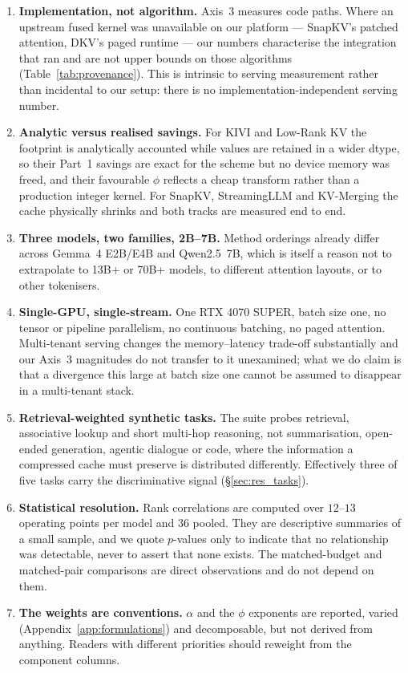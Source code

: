 \documentclass[sigplan,10pt,anonymous,review,nonacm]{acmart}
\begin{document}
\begin{enumerate}[leftmargin=*,itemsep=2.0pt,topsep=3pt]
\item \textbf{Implementation, not algorithm.} Axis~3 measures code paths.
  Where an upstream fused kernel was unavailable on our platform --- SnapKV's
  patched attention, DKV's paged runtime --- our numbers characterise the
  integration that ran and are not upper bounds on those algorithms
  (Table~\ref{tab:provenance}). This is intrinsic to serving measurement
  rather than incidental to our setup: there is no implementation-independent
  serving number.
\item \textbf{Analytic versus realised savings.} For KIVI and Low-Rank KV the
  footprint is analytically accounted while values are retained in a wider
  dtype, so their Part~1 savings are exact for the scheme but no device memory
  was freed, and their favourable $\phi$ reflects a cheap transform rather
  than a production integer kernel. For SnapKV, StreamingLLM and KV-Merging
  the cache physically shrinks and both tracks are measured end to end.
\item \textbf{Three models, two families, 2B--7B.} Method orderings already
  differ across Gemma~4 E2B/E4B and Qwen2.5~7B, which is itself a reason not
  to extrapolate to 13B+ or 70B+ models, to different attention layouts, or to
  other tokenisers.
\item \textbf{Single-GPU, single-stream.} One RTX 4070 SUPER, batch size one,
  no tensor or pipeline parallelism, no continuous batching, no paged
  attention. Multi-tenant serving changes the memory--latency trade-off
  substantially and our Axis~3 magnitudes do not transfer to it unexamined;
  what we do claim is that a divergence this large at batch size one cannot be
  assumed to disappear in a multi-tenant stack.
\item \textbf{Retrieval-weighted synthetic tasks.} The suite probes retrieval,
  associative lookup and short multi-hop reasoning, not summarisation,
  open-ended generation, agentic dialogue or code, where the information a
  compressed cache must preserve is distributed differently. Effectively three
  of five tasks carry the discriminative signal (\S\ref{sec:res_tasks}).
\item \textbf{Statistical resolution.} Rank correlations are computed over
  $12$--$13$ operating points per model and $36$ pooled. They are descriptive
  summaries of a small sample, and we quote $p$-values only to indicate that
  no relationship was detectable, never to assert that none exists. The
  matched-budget and matched-pair comparisons are direct observations and do
  not depend on them.
\item \textbf{The weights are conventions.} $\alpha$ and the $\phi$ exponents
  are reported, varied (Appendix~\ref{app:formulations}) and decomposable, but
  not derived from anything. Readers with different priorities should reweight
  from the component columns.
\end{enumerate}
\end{document}
